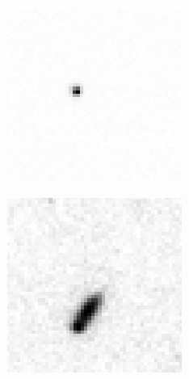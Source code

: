 \begin{figure}[!h]
\centering
    \begin{subfigure}[t]{.23\textwidth}
        \centering
        \includegraphics[width=\textwidth]{images/wrongImage8.png}
        \caption{}
        \label{fig:pointcosmicmis3}
    \end{subfigure}
    \begin{subfigure}[t]{.23\textwidth}
        \centering
        \includegraphics[width=\textwidth]{images/wrongImage18.png}

\end{subfigure}
\end{figure}
